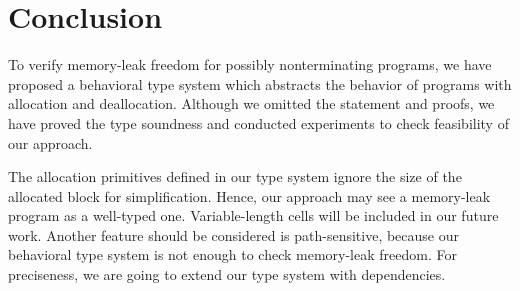 \documentclass{sigplanconf}
\begin{document}
\section{Conclusion}
To verify memory-leak freedom for possibly nonterminating programs, we
have proposed a behavioral type system which abstracts the behavior of
programs with allocation and deallocation. Although we omitted the
statement and proofs, we have proved the type soundness and conducted
experiments to check feasibility of our approach.

The allocation primitives defined in our type system ignore the size
of the allocated block for simplification.  Hence, our approach may
see a memory-leak program as a well-typed one.  Variable-length cells
will be included in our future work.  Another feature should be
considered is path-sensitive, because our behavioral type system is
not enough to check memory-leak freedom. For preciseness, we are going
to extend our type system with dependencies.




\end{document}
